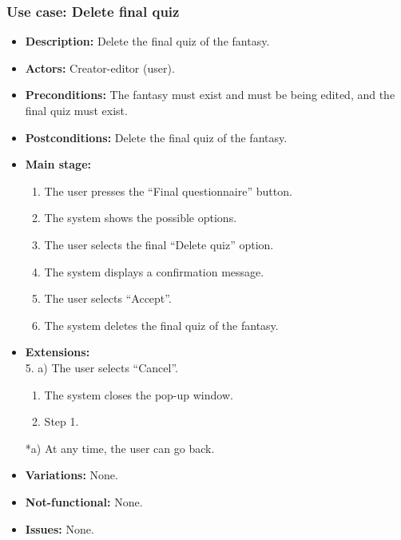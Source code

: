 \subsubsection{Use case: Delete final quiz}
\begin{itemize}
	\item \textbf{Description:} Delete the final quiz of the fantasy.
	\item \textbf{Actors:} Creator-editor (user).
	\item \textbf{Preconditions:} The fantasy must exist and must be being edited, and the final quiz must exist.
	\item \textbf{Postconditions:} Delete the final quiz of the fantasy.
	\item \textbf{Main stage:}
	\begin{enumerate}
		\item The user presses the ``Final questionnaire'' button.
		\item The system shows the possible options.
		\item The user selects the final ``Delete quiz'' option.
		\item The system displays a confirmation message.
		\item The user selects ``Accept''.
		\item The system deletes the final quiz of the fantasy.
	\end{enumerate}
	\item \textbf{Extensions:} \\ 5. a) The user selects ``Cancel''.
	\begin{enumerate}
		\item The system closes the pop-up window.
		\item Step 1.
	\end{enumerate}
	*a) At any time, the user can go back.
	\item \textbf{Variations:} None.
	\item \textbf{Not-functional:} None.
	\item \textbf{Issues:} None.
\end{itemize}


